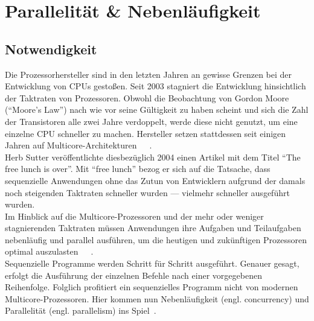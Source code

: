 \pagebreak

\section{Parallelität \& Nebenläufigkeit}

\subsection{Notwendigkeit}\label{subsec:notwendigkeit}
Die Prozessorhersteller sind in den letzten Jahren an gewisse Grenzen bei der Entwicklung von CPUs gestoßen. Seit 2003 stagniert die Entwicklung hinsichtlich der Taktraten von Prozessoren. Obwohl die Beobachtung von Gordon Moore (\enquote{Moore's Law}) nach wie vor seine Gültigkeit zu haben scheint und sich die Zahl der Transistoren alle zwei Jahre verdoppelt, werde diese nicht genutzt, um eine einzelne CPU schneller zu machen. Hersteller setzen stattdessen seit einigen Jahren auf Multicore-Architekturen~\cite[S.~1]{butcher_seven_2014}~\cite[S.~108]{vernon_reactive_2016}~\cite{sutter_free_2004}.\\
Herb Sutter veröffentlichte diesbezüglich 2004 einen Artikel mit dem Titel \enquote{The free lunch is over}. Mit \enquote{free lunch} bezog er sich auf die Tatsache, dass sequenzielle Anwendungen ohne das Zutun von Entwicklern aufgrund der damals noch steigenden Taktraten schneller wurden --- vielmehr schneller ausgeführt wurden.\\
Im Hinblick auf die Multicore-Prozessoren und der mehr oder weniger stagnierenden Taktraten müssen Anwendungen ihre Aufgaben und Teilaufgaben nebenläufig und parallel ausführen, um die heutigen und zukünftigen Prozessoren optimal auszulasten~\cite[S.~45]{kuhn_reactive_2015}~\cite{sutter_free_2004}~\cite[S.~1]{butcher_seven_2014}.\\
Sequenzielle Programme werden Schritt für Schritt ausgeführt. Genauer gesagt, erfolgt die Ausführung der einzelnen Befehle nach einer vorgegebenen Reihenfolge. Folglich profitiert ein sequenzielles Programm nicht von modernen Multicore-Prozessoren. Hier kommen nun Nebenläufigkeit (engl. concurrency) und Parallelität (engl. parallelism) ins Spiel~\cite[S.~3]{butcher_seven_2014}.\\

